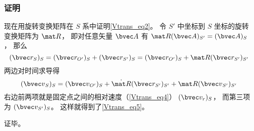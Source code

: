 \subsubsection{证明}
现在用旋转变换矩阵在 $S$ 系中证明\autoref{Vtrans_eq2}。 令 $S'$ 中坐标到 $S$ 坐标的旋转变换矩阵为 $\mat R$， 即对任意矢量 $\bvec A$ 有 $\mat R (\bvec A)_{S'} = (\bvec A)_S$， 那么
\begin{equation}
(\bvec r_S)_S = (\bvec r_{O'})_S + (\bvec r_{S'})_S = (\bvec r_{O'})_S + \mat R(\bvec r_{S'})_{S'}
\end{equation}
两边对时间求导得
\begin{equation}
({\bvec v}_S)_S = ({\bvec v}_{O'})_S + \dot{\mat R}(\bvec r_{S'})_{S'} + \mat R ({\bvec v}_{S'})_{S'}
\end{equation}
右边前两项就是固定点之间的相对速度（\autoref{Vtrans_eq4}） $(\bvec v_r)_S$， 而第三项为 $(\bvec v_{S'})_S$。 这样就得到了\autoref{Vtrans_eq5}。

证毕。
